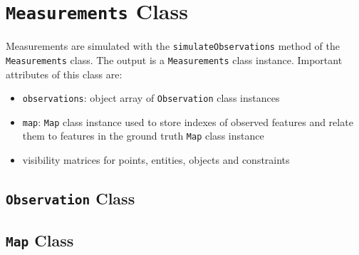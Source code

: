 \section{\texttt{Measurements} Class}
Measurements are simulated with the \texttt{simulateObservations} method of the \texttt{Measurements} class.
The output is a \texttt{Measurements} class instance. Important attributes of this class are:
\begin{itemize}
\item \texttt{observations}: object array of \texttt{Observation} class instances
\item \texttt{map}: \texttt{Map} class instance used to store indexes of observed features and relate them to features in the ground truth \texttt{Map} class instance
\item visibility matrices for points, entities, objects and constraints
\end{itemize}

\subsection{\texttt{Observation} Class}
\subsection{\texttt{Map} Class}

